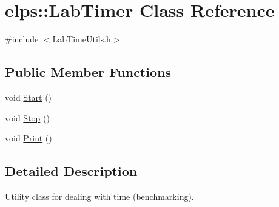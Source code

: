 \hypertarget{classelps_1_1_lab_timer}{\section{elps\+:\+:Lab\+Timer Class Reference}
\label{classelps_1_1_lab_timer}
}


{\ttfamily \#include $<$Lab\+Time\+Utils.\+h$>$}

\subsection*{Public Member Functions}
\begin{DoxyCompactItemize}
\item 
void \hyperlink{classelps_1_1_lab_timer_a254ec0abf4837982f16229c9d51703fb}{Start} ()
\item 
void \hyperlink{classelps_1_1_lab_timer_a32bf0ba963184fa4244eca3b40804604}{Stop} ()
\item 
void \hyperlink{classelps_1_1_lab_timer_af371935d2082a0ab98eb3d492714f950}{Print} ()
\end{DoxyCompactItemize}


\subsection{Detailed Description}
Utility class for dealing with time (benchmarking). 

